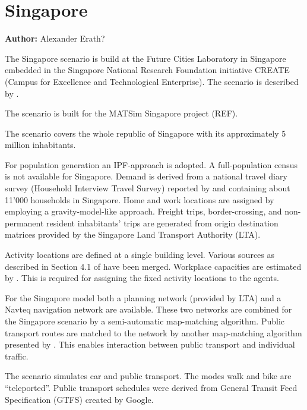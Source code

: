 \section{Singapore}
\label{ch:scenarios:singapore}
\hfill \textbf{Author:} Alexander Erath?

The Singapore scenario is build at the Future Cities Laboratory in Singapore embedded in the Singapore National Research Foundation initiative CREATE (Campus for Excellence and Technological Enterprise). The scenario is described by \citet[][]{ErathEtAl_TechRep_FCL_forth, Erath_unpub_UniSeoul_2011}.

The scenario is built for the MATSim Singapore project (REF).

The scenario covers the whole republic of Singapore with its approximately 5 million inhabitants.

For population generation an IPF-approach is adopted. A full-population census is not available for Singapore. Demand is derived from a national travel diary survey (Household Interview Travel Survey) reported by \citet[][]{Choi_JOUR_2010} and containing about 11'000 households in Singapore. Home and work locations are assigned by employing a gravity-model-like approach. Freight trips, border-crossing, and non-permanent resident inhabitants' trips are generated from origin destination matrices provided by the Singapore Land Transport Authority (LTA).

Activity locations are defined at a single building level. Various sources as described in Section 4.1 of \citet[][]{ErathEtAl_TechRep_FCL_forth} have been merged. Workplace capacities are estimated by \citet[][]{OrdonezErath_TRR_2013}. This is required for assigning the fixed activity locations to the agents.

For the Singapore model both a planning network (provided by LTA) and a Navteq navigation network are available. These two networks are combined for the Singapore scenario by a semi-automatic map-matching algorithm. Public transport routes are matched to the network by another map-matching algorithm presented by \citet[][]{Ordonez_HKSTS_2011, Ordonez_Webpage_2011_4}. This enables interaction between public transport and individual traffic.

The scenario simulates car and public transport. The modes walk and bike are ``teleported''. Public transport schedules were derived from General Transit Feed Specification (GTFS) created by Google.

